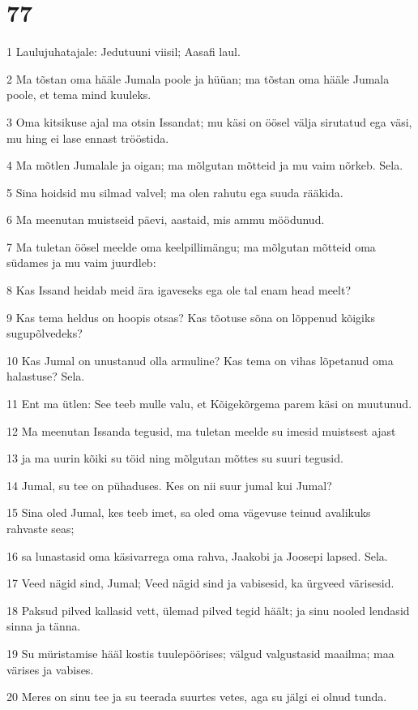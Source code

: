 \chapter{77}

\par 1 Laulujuhatajale: Jedutuuni viisil; Aasafi laul.
\par 2 Ma tõstan oma hääle Jumala poole ja hüüan; ma tõstan oma hääle Jumala poole, et tema mind kuuleks.
\par 3 Oma kitsikuse ajal ma otsin Issandat; mu käsi on öösel välja sirutatud ega väsi, mu hing ei lase ennast trööstida.
\par 4 Ma mõtlen Jumalale ja oigan; ma mõlgutan mõtteid ja mu vaim nõrkeb. Sela.
\par 5 Sina hoidsid mu silmad valvel; ma olen rahutu ega suuda rääkida.
\par 6 Ma meenutan muistseid päevi, aastaid, mis ammu möödunud.
\par 7 Ma tuletan öösel meelde oma keelpillimängu; ma mõlgutan mõtteid oma südames ja mu vaim juurdleb:
\par 8 Kas Issand heidab meid ära igaveseks ega ole tal enam head meelt?
\par 9 Kas tema heldus on hoopis otsas? Kas tõotuse sõna on lõppenud kõigiks sugupõlvedeks?
\par 10 Kas Jumal on unustanud olla armuline? Kas tema on vihas lõpetanud oma halastuse? Sela.
\par 11 Ent ma ütlen: See teeb mulle valu, et Kõigekõrgema parem käsi on muutunud.
\par 12 Ma meenutan Issanda tegusid, ma tuletan meelde su imesid muistsest ajast
\par 13 ja ma uurin kõiki su töid ning mõlgutan mõttes su suuri tegusid.
\par 14 Jumal, su tee on pühaduses. Kes on nii suur jumal kui Jumal?
\par 15 Sina oled Jumal, kes teeb imet, sa oled oma vägevuse teinud avalikuks rahvaste seas;
\par 16 sa lunastasid oma käsivarrega oma rahva, Jaakobi ja Joosepi lapsed. Sela.
\par 17 Veed nägid sind, Jumal; Veed nägid sind ja vabisesid, ka ürgveed värisesid.
\par 18 Paksud pilved kallasid vett, ülemad pilved tegid häält; ja sinu nooled lendasid sinna ja tänna.
\par 19 Su müristamise hääl kostis tuulepöörises; välgud valgustasid maailma; maa värises ja vabises.
\par 20 Meres on sinu tee ja su teerada suurtes vetes, aga su jälgi ei olnud tunda.

